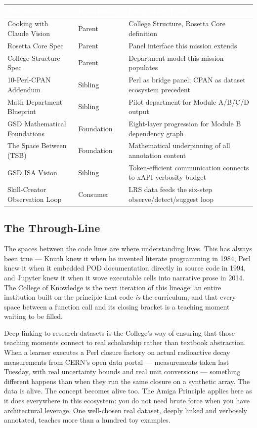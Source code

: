 \documentclass[11pt,letterpaper]{article}
\newcommand{\tableheader}[1]{\textbf{\sffamily\textcolor{white}{#1}}}
\begin{document}
\begin{center}
\begin{tabularx}{\textwidth}{L{4cm}L{4cm}X}
\toprule
{}
\tableheader{Document} & \tableheader{Relationship} & \tableheader{Integration Point} \\
\midrule
Cooking with Claude Vision & Parent & College Structure, Rosetta Core definition \\
Rosetta Core Spec & Parent & Panel interface this mission extends \\
College Structure Spec & Parent & Department model this mission populates \\
10-Perl-CPAN Addendum & Sibling & Perl as bridge panel; CPAN as dataset ecosystem precedent \\
Math Department Blueprint & Sibling & Pilot department for Module A/B/C/D output \\
GSD Mathematical Foundations & Foundation & Eight-layer progression for Module B dependency graph \\
The Space Between (TSB) & Foundation & Mathematical underpinning of all annotation content \\
GSD ISA Vision & Sibling & Token-efficient communication connects to xAPI verbosity budget \\
Skill-Creator Observation Loop & Consumer & LRS data feeds the six-step observe/detect/suggest loop \\
\bottomrule
\end{tabularx}
\end{center}

\subsection{The Through-Line}

The spaces between the code lines are where understanding lives. This has always been true --- Knuth knew it when he invented literate programming in 1984, Perl knew it when it embedded POD documentation directly in source code in 1994, and Jupyter knew it when it wove executable cells into narrative prose in 2014. The College of Knowledge is the next iteration of this lineage: an entire institution built on the principle that code \textit{is} the curriculum, and that every space between a function call and its closing bracket is a teaching moment waiting to be filled.

Deep linking to research datasets is the College's way of ensuring that those teaching moments connect to real scholarship rather than textbook abstraction. When a learner executes a Perl closure factory on actual radioactive decay measurements from CERN's open data portal --- measurements taken last Tuesday, with real uncertainty bounds and real unit conversions --- something different happens than when they run the same closure on a synthetic array. The data is alive. The concept becomes alive too. The Amiga Principle applies here as it does everywhere in this ecosystem: you do not need brute force when you have architectural leverage. One well-chosen real dataset, deeply linked and verbosely annotated, teaches more than a hundred toy examples.
\end{document}
